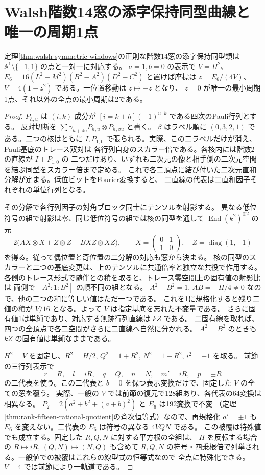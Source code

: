 \section{Walsh階数14窓の添字保持同型曲線と唯一の周期1点}
\label{sec:walsh-rank-fourteen-orbits}
\begin{theorem}\label{thm:walsh-rank-fourteen-orbits}
定理\ref{thm:walsh-symmetric-windows}の正則な階数14窓の添字保持同型類は
$\mathbb A^1\setminus\{-1,1\}$ の点と一対一に対応する。
$a=1,b=0$ の表示で $V=H^2$、
$E_6=16(L^2-M^2)(B^2-A^2)(D^2-C^2)$ と置けば座標は
$z=E_6/(4V)$、$V=4(1-z^2)$ である。一位置移動は $z\mapsto-z$ となり、
$z=0$ が唯一の最小周期1点、それ以外の全点の最小周期は2である。
\end{theorem}
\begin{proof}
$P_{h,u}$ は $(i,k)$ 成分が $[i=k+h](-1)^{u\cdot k}$ である四次のPauli行列とする。
反対切断を $\sum\gamma_{h+4u}P_{h,u}\otimes P_{h,\beta u}$ と書く。
$\beta$ はラベル順に $(0,3,2,1)$ である。二つの核はともに
$I,P_{1,0}$ で張られる。実際、この二ラベルだけが消え、Pauli基底のトレース双対は
各行列自身のスカラー倍である。各核内には階数2の直線が $I\pm P_{1,0}$ の
二つだけあり、いずれも二次元の像と相手側の二次元空間を結ぶ同型をスカラー倍まで定める。
これで各二頂点に結び付いた二次元直和分解が定まる。低位ビットをFourier変換すると、
二直線の代表は二直和因子それぞれの単位行列となる。

その分解で各行列因子の対角ブロック同士にテンソルを射影する。
異なる低位符号の組で射影は零、同じ低位符号の組では核の同型を通して
$\operatorname{End}(k^2)^{\otimes2}$ の元
\[
 2\big(A X\otimes X+ Z\otimes Z+B XZ\otimes XZ\big),\qquad
 X=\begin{pmatrix}0&1\\1&0\end{pmatrix},\quad Z=\operatorname{diag}(1,-1)
\]
を得る。従って偶位置と奇位置の二分解の対応も窓から決まる。
核の同型のスカラーと二つの基底変更は、上のテンソルに共通倍率と独立な共役で作用する。
各側のトレース形式で随伴との積を取ると、トレース零空間上の固有値の射影比は
両側で $[A^2:1:B^2]$ の順不同の組となる。
$A^2+B^2=1$, $AB=-H/4\ne0$ なので、他の二つの和に等しい値はただ一つである。
これを1に規格化すると残り二値の積が $V/16$ となる。よって $V$ は指定基底を忘れた不変量である。
さらに固有値1は単純であり、対応する無跡行列直線は $kZ$ である。
二固有線を取れば、四つの全頂点で各二空間がさらに二直線へ自然に分かれる。
$A^2=B^2$ のときも $kZ$ の固有値は単純なままである。

$H^2=V$ を固定し、$R^2=H/2$, $Q^2=1+R^2$, $N^2=1-R^2$, $i^2=-1$ を取る。
前節の三行列表示で
\[
 r=R,\quad l=iR,\quad q=Q,\quad n=N,\quad m'=iR,\quad p=\pm R
\]
の二代表を使う。この二代表と $b=0$ を保つ表示変換だけで、固定した $V$ の全ての窓を覆う。
実際、一般の $V$ では前節の復元で128組あり、各代表の64変換は相異なる。
$P_2=2(a^2+b^2+(a+b)^2)$ と $E_6$ は192変換で不変
（定理\ref{thm:rank-fifteen-rational-quotient}の斉次恒等式）なので、再規格化 $a'=\pm1$
も $E_6$ を変えない。二代表の $E_6$ は符号の異なる $4VQN$ である。
この被覆は特殊値でも成立する。固定した $R,Q,N$ に対する平方根の全組は、
$H$ を反転する場合の $R\mapsto iR$, $(Q,N)\mapsto(N,Q)$ も含めて
$R,Q,N$ の符号・四乗根倍で列挙される。一般値での被覆はこれらの線型式の恒等式なので
全点に特殊化できる。$V=4$ では前節により一軌道である。


\end{proof}
